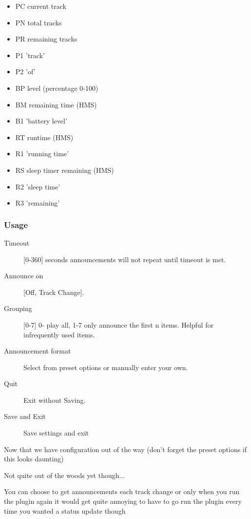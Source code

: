 \begin{itemize}
\item PC current track
\item PN total tracks
\item PR remaining tracks
\item P1 'track'
\item P2 'of'
\end{itemize}

\begin{itemize}
\item BP level (percentage 0-100)
\item BM remaining time (HMS)
\item B1 'battery level'
\end{itemize}

\begin{itemize}
\item RT runtime (HMS)
\item R1 'running time'
\item RS sleep timer remaining (HMS)
\item R2 'sleep time'
\item R3 'remaining'
\end{itemize}

\subsubsection{Usage}
\begin{description}
\item [Timeout] [0-360] seconds announcements will not repeat until timeout is met.
\item [Announce on] [Off, Track Change].
\item [Grouping] [0-7] 0- play all, 1-7 only announce the first n items.
                Helpful for infrequently used items.
\item [Announcement format] Select from preset options or manually enter your own.
\item [Quit] Exit without Saving.
\item [Save and Exit] Save settings and exit
\end{description}

Now that we have configuration out of the way (don't forget the preset options if this looks daunting)

Not quite out of the woods yet though...

You can choose to get announcements each track change or only when you run the plugin again
it would get quite annoying to have to go run the plugin every time you wanted a status update though

